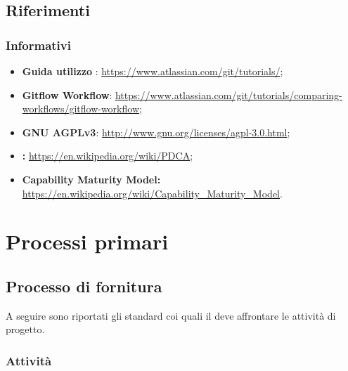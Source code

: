 \documentclass[a4paper, titlepage]{article}
\begin{document}
\subsection{Riferimenti}


\subsubsection{Informativi}
\label{rifinfo}
\begin{itemize}
	\item \textbf{Guida utilizzo }: \url{https://www.atlassian.com/git/tutorials/};
	\item \textbf{Gitflow Workflow}: \url{https://www.atlassian.com/git/tutorials/comparing-workflows/gitflow-workflow};
	\item \textbf{GNU AGPLv3}: \url{http://www.gnu.org/licenses/agpl-3.0.html};
	\item \textbf{:}
	\url{https://en.wikipedia.org/wiki/PDCA};
	\item \textbf{Capability Maturity Model:}
	\url{https://en.wikipedia.org/wiki/Capability_Maturity_Model}.
\end{itemize}

\newpage

\section{Processi primari}

\subsection{Processo di fornitura}
A seguire sono riportati gli standard coi quali il  deve affrontare le attività di progetto.


\subsubsection{Attività}
\end{document}
